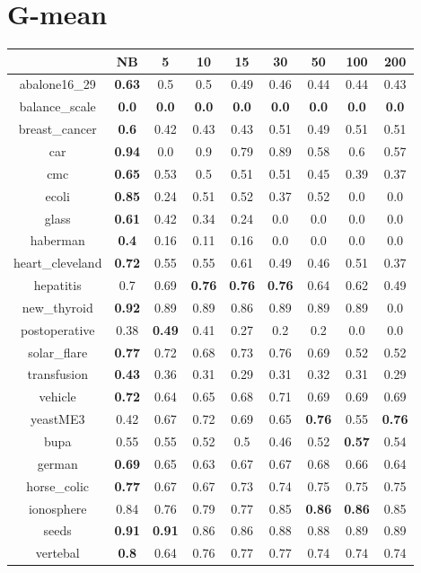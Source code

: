 \documentclass{article}%
\begin{document}
%
\section*{G{-}mean}%
\begin{tabular}{c|cccccccc}%
\hline%
&NB&5&10&15&30&50&100&200\\%
\hline%
abalone16\_29&\textbf{0.63}&0.5&0.5&0.49&0.46&0.44&0.44&0.43\\%
\hline%
balance\_scale&\textbf{0.0}&\textbf{0.0}&\textbf{0.0}&\textbf{0.0}&\textbf{0.0}&\textbf{0.0}&\textbf{0.0}&\textbf{0.0}\\%
\hline%
breast\_cancer&\textbf{0.6}&0.42&0.43&0.43&0.51&0.49&0.51&0.51\\%
\hline%
car&\textbf{0.94}&0.0&0.9&0.79&0.89&0.58&0.6&0.57\\%
\hline%
cmc&\textbf{0.65}&0.53&0.5&0.51&0.51&0.45&0.39&0.37\\%
\hline%
ecoli&\textbf{0.85}&0.24&0.51&0.52&0.37&0.52&0.0&0.0\\%
\hline%
glass&\textbf{0.61}&0.42&0.34&0.24&0.0&0.0&0.0&0.0\\%
\hline%
haberman&\textbf{0.4}&0.16&0.11&0.16&0.0&0.0&0.0&0.0\\%
\hline%
heart\_cleveland&\textbf{0.72}&0.55&0.55&0.61&0.49&0.46&0.51&0.37\\%
\hline%
hepatitis&0.7&0.69&\textbf{0.76}&\textbf{0.76}&\textbf{0.76}&0.64&0.62&0.49\\%
\hline%
new\_thyroid&\textbf{0.92}&0.89&0.89&0.86&0.89&0.89&0.89&0.0\\%
\hline%
postoperative&0.38&\textbf{0.49}&0.41&0.27&0.2&0.2&0.0&0.0\\%
\hline%
solar\_flare&\textbf{0.77}&0.72&0.68&0.73&0.76&0.69&0.52&0.52\\%
\hline%
transfusion&\textbf{0.43}&0.36&0.31&0.29&0.31&0.32&0.31&0.29\\%
\hline%
vehicle&\textbf{0.72}&0.64&0.65&0.68&0.71&0.69&0.69&0.69\\%
\hline%
yeastME3&0.42&0.67&0.72&0.69&0.65&\textbf{0.76}&0.55&\textbf{0.76}\\%
\hline%
bupa&0.55&0.55&0.52&0.5&0.46&0.52&\textbf{0.57}&0.54\\%
\hline%
german&\textbf{0.69}&0.65&0.63&0.67&0.67&0.68&0.66&0.64\\%
\hline%
horse\_colic&\textbf{0.77}&0.67&0.67&0.73&0.74&0.75&0.75&0.75\\%
\hline%
ionosphere&0.84&0.76&0.79&0.77&0.85&\textbf{0.86}&\textbf{0.86}&0.85\\%
\hline%
seeds&\textbf{0.91}&\textbf{0.91}&0.86&0.86&0.88&0.88&0.89&0.89\\%
\hline%
vertebal&\textbf{0.8}&0.64&0.76&0.77&0.77&0.74&0.74&0.74\\%
\hline%
\end{tabular}

%
\end{document}

